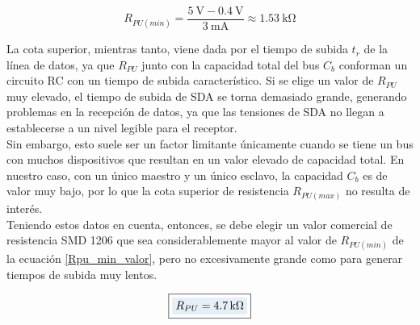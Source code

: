 \begin{equation}\label{Rpu_min_valor}
    R_{PU(min)} = \frac{\SI{5}{\volt}-\SI{0.4}{\volt}}{\SI{3}{\milli\ampere}} \approx \SI{1.53}{\kilo\ohm}
\end{equation}

La {\Medium cota superior}, mientras tanto, viene dada por el tiempo de subida $t_r$ de la línea de datos, ya que $R_{PU}$ junto con la capacidad total del bus $C_b$ conforman un circuito RC con un tiempo de subida característico. Si se elige un valor de $R_{PU}$ muy elevado, el tiempo de subida de SDA se torna demasiado grande, generando problemas en la recepción de datos, ya que las tensiones de SDA no llegan a establecerse a un nivel legible para el receptor.\\ 

Sin embargo, esto suele ser un factor limitante únicamente cuando se tiene un bus con muchos dispositivos que resultan en un valor elevado de capacidad total. En nuestro caso, con un único maestro y un único esclavo, la capacidad $C_b$ es de valor muy bajo, por lo que la cota superior de resistencia $R_{PU(max)}$ no resulta de interés.\\

Teniendo estos datos en cuenta, entonces, se debe elegir un valor comercial de resistencia SMD 1206 que sea considerablemente mayor al valor de $R_{PU(min)}$ de la ecuación \ref{Rpu_min_valor}, pero no excesivamente grande como para generar tiempos de subida muy lentos.

\begin{equation*}
    \boxed{\highlight{
        R_{PU} = \SI{4.7}{\kilo\ohm}
    }}
\end{equation*}